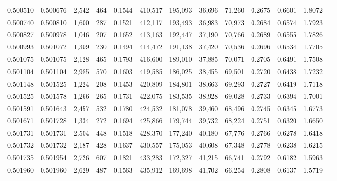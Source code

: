 \begin{tabular}{rrrrrrrrrrrrr}
0.500510 & 0.500676 &  2,542 &   464 &                                     0.1544 & 410,517 & 195,093 &  36,696 &  71,260 & 0.2675 & 0.6601 & 1.8072 \\
0.500740 & 0.500810 &  1,600 &   287 &                                     0.1521 & 412,117 & 193,493 &  36,983 &  70,973 & 0.2684 & 0.6574 & 1.7923 \\
0.500827 & 0.500978 &  1,046 &   207 &                                     0.1652 & 413,163 & 192,447 &  37,190 &  70,766 & 0.2689 & 0.6555 & 1.7826 \\
0.500993 & 0.501072 &  1,309 &   230 &                                     0.1494 & 414,472 & 191,138 &  37,420 &  70,536 & 0.2696 & 0.6534 & 1.7705 \\
0.501075 & 0.501075 &  2,128 &   465 &                                     0.1793 & 416,600 & 189,010 &  37,885 &  70,071 & 0.2705 & 0.6491 & 1.7508 \\
0.501104 & 0.501104 &  2,985 &   570 &                                     0.1603 & 419,585 & 186,025 &  38,455 &  69,501 & 0.2720 & 0.6438 & 1.7232 \\
0.501148 & 0.501525 &  1,224 &   208 &                                     0.1453 & 420,809 & 184,801 &  38,663 &  69,293 & 0.2727 & 0.6419 & 1.7118 \\
0.501525 & 0.501578 &  1,266 &   265 &                                     0.1731 & 422,075 & 183,535 &  38,928 &  69,028 & 0.2733 & 0.6394 & 1.7001 \\
0.501591 & 0.501643 &  2,457 &   532 &                                     0.1780 & 424,532 & 181,078 &  39,460 &  68,496 & 0.2745 & 0.6345 & 1.6773 \\
0.501671 & 0.501728 &  1,334 &   272 &                                     0.1694 & 425,866 & 179,744 &  39,732 &  68,224 & 0.2751 & 0.6320 & 1.6650 \\
0.501731 & 0.501731 &  2,504 &   448 &                                     0.1518 & 428,370 & 177,240 &  40,180 &  67,776 & 0.2766 & 0.6278 & 1.6418 \\
0.501732 & 0.501732 &  2,187 &   428 &                                     0.1637 & 430,557 & 175,053 &  40,608 &  67,348 & 0.2778 & 0.6238 & 1.6215 \\
0.501735 & 0.501954 &  2,726 &   607 &                                     0.1821 & 433,283 & 172,327 &  41,215 &  66,741 & 0.2792 & 0.6182 & 1.5963 \\
0.501960 & 0.501960 &  2,629 &   487 &                                     0.1563 & 435,912 & 169,698 &  41,702 &  66,254 & 0.2808 & 0.6137 & 1.5719 \\

\end{tabular}
